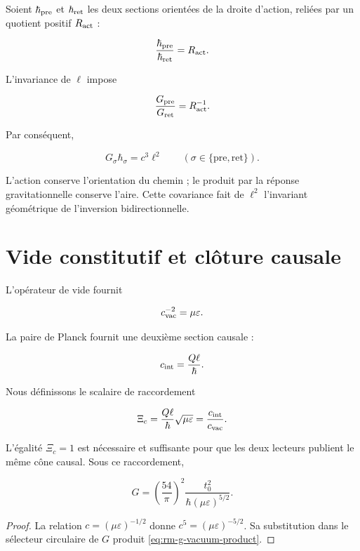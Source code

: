 Soient \(\hbar_{\rm pre}\) et \(\hbar_{\rm ret}\) les deux sections orientées
de la droite d'action, reliées par un quotient positif
\(R_{\rm act}\) :

\[
\frac{\hbar_{\rm pre}}{\hbar_{\rm ret}}=R_{\rm act}.
\]

L'invariance de \(\ell\) impose

\[
\frac{G_{\rm pre}}{G_{\rm ret}}=R_{\rm act}^{-1}.
\]

Par conséquent,

\begin{equation}
G_{\sigma}\hbar_{\sigma}=c^3\ell^2
\qquad(\sigma\in\{\mathrm{pre},\mathrm{ret}\}).
\label{eq:rm-two-way-area}
\end{equation}

L'action conserve l'orientation du chemin ; le produit par la réponse
gravitationnelle conserve l'aire. Cette covariance fait de \(\ell^2\)
l'invariant géométrique de l'inversion bidirectionnelle.

\section{Vide constitutif et clôture causale}

L'opérateur de vide fournit

\[
c_{\rm vac}^{-2}=\mu\varepsilon.
\]

La paire de Planck fournit une deuxième section causale :

\[
c_{\rm int}=\frac{Q\ell}{\hbar}.
\]

Nous définissons le scalaire de raccordement

\begin{equation}
\Xi_c=\frac{Q\ell}{\hbar}\sqrt{\mu\varepsilon}
=\frac{c_{\rm int}}{c_{\rm vac}}.
\label{eq:rm-causal-seam}
\end{equation}

L'égalité \(\Xi_c=1\) est nécessaire et suffisante pour que les deux lecteurs
publient le même cône causal. Sous ce raccordement,

\begin{equation}
\boxed{
G=\left(\frac{54}{\pi}\right)^2
\frac{t_0^2}{\hbar(\mu\varepsilon)^{5/2}}.}
\label{eq:rm-g-vacuum-product}
\end{equation}

\begin{proof}
La relation \(c=(\mu\varepsilon)^{-1/2}\) donne
\(c^5=(\mu\varepsilon)^{-5/2}\). Sa substitution dans le sélecteur circulaire de
\(G\) produit \eqref{eq:rm-g-vacuum-product}.
\end{proof}

